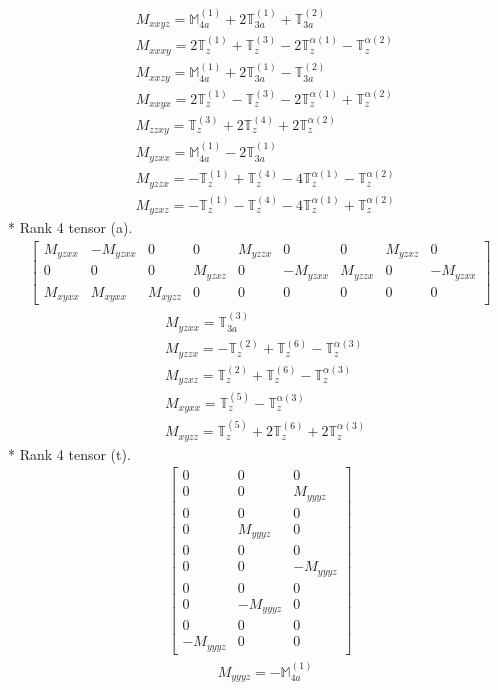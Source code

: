 \documentclass[fleqn,8pt,landscape]{jsarticle}
\begin{document}
\begin{align*}
& M_{xxyz} = \mathbb{M}_{4a}^{(1)} + 2 \mathbb{T}_{3a}^{(1)} + \mathbb{T}_{3a}^{(2)} \\
& M_{xxxy} = 2 \mathbb{T}_{z}^{(1)} + \mathbb{T}_{z}^{(3)} - 2 \mathbb{T}_{z}^{\alpha(1)} - \mathbb{T}_{z}^{\alpha(2)} \\
& M_{xxzy} = \mathbb{M}_{4a}^{(1)} + 2 \mathbb{T}_{3a}^{(1)} - \mathbb{T}_{3a}^{(2)} \\
& M_{xxyx} = 2 \mathbb{T}_{z}^{(1)} - \mathbb{T}_{z}^{(3)} - 2 \mathbb{T}_{z}^{\alpha(1)} + \mathbb{T}_{z}^{\alpha(2)} \\
& M_{zzxy} = \mathbb{T}_{z}^{(3)} + 2 \mathbb{T}_{z}^{(4)} + 2 \mathbb{T}_{z}^{\alpha(2)} \\
& M_{yzxx} = \mathbb{M}_{4a}^{(1)} - 2 \mathbb{T}_{3a}^{(1)} \\
& M_{yzzx} = - \mathbb{T}_{z}^{(1)} + \mathbb{T}_{z}^{(4)} - 4 \mathbb{T}_{z}^{\alpha(1)} - \mathbb{T}_{z}^{\alpha(2)} \\
& M_{yzxz} = - \mathbb{T}_{z}^{(1)} - \mathbb{T}_{z}^{(4)} - 4 \mathbb{T}_{z}^{\alpha(1)} + \mathbb{T}_{z}^{\alpha(2)}
\end{align*}
* Rank 4 tensor (a).
\begin{align*}
\begin{bmatrix} M_{yzxx} & - M_{yzxx} & 0 & 0 & M_{yzzx} & 0 & 0 & M_{yzxz} & 0 \\ 0 & 0 & 0 & M_{yzxz} & 0 & - M_{yzxx} & M_{yzzx} & 0 & - M_{yzxx} \\ M_{xyxx} & M_{xyxx} & M_{xyzz} & 0 & 0 & 0 & 0 & 0 & 0 \end{bmatrix}
\end{align*}
\begin{align*}
& M_{yzxx} = \mathbb{T}_{3a}^{(3)} \\
& M_{yzzx} = - \mathbb{T}_{z}^{(2)} + \mathbb{T}_{z}^{(6)} - \mathbb{T}_{z}^{\alpha(3)} \\
& M_{yzxz} = \mathbb{T}_{z}^{(2)} + \mathbb{T}_{z}^{(6)} - \mathbb{T}_{z}^{\alpha(3)} \\
& M_{xyxx} = \mathbb{T}_{z}^{(5)} - \mathbb{T}_{z}^{\alpha(3)} \\
& M_{xyzz} = \mathbb{T}_{z}^{(5)} + 2 \mathbb{T}_{z}^{(6)} + 2 \mathbb{T}_{z}^{\alpha(3)}
\end{align*}
* Rank 4 tensor (t).
\begin{align*}
\begin{bmatrix} 0 & 0 & 0 \\ 0 & 0 & M_{yyyz} \\ 0 & 0 & 0 \\ 0 & M_{yyyz} & 0 \\ 0 & 0 & 0 \\ 0 & 0 & - M_{yyyz} \\ 0 & 0 & 0 \\ 0 & - M_{yyyz} & 0 \\ 0 & 0 & 0 \\ - M_{yyyz} & 0 & 0 \end{bmatrix}
\end{align*}
\begin{align*}
& M_{yyyz} = - \mathbb{M}_{4a}^{(1)}
\end{align*}
\end{document}
